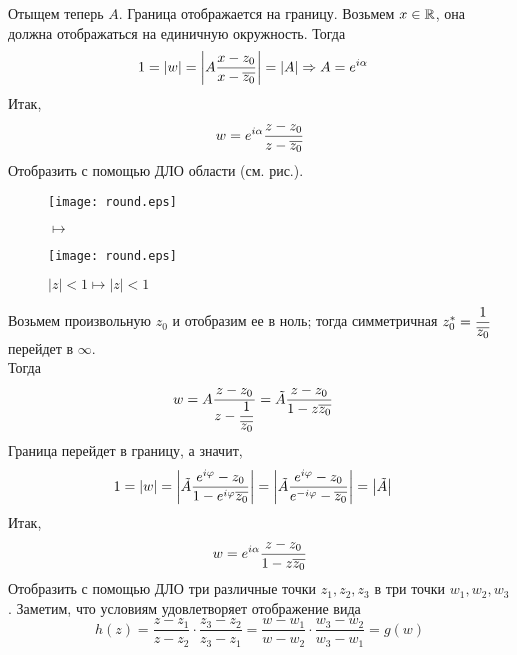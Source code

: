 Отыщем теперь $A$. Граница отображается на границу. Возьмем $x \in \mathbb{R}$, она
должна отображаться на единичную окружность. Тогда
\begin{align*}
    & 1 = \left|{w}\right| = \left|{A\frac{x-z_0}{x-\overline{z_0}}}\right| = \left| A \right| \Rightarrow A = e^{i\alpha}
\end{align*}
Итак,
\begin{equation}\label{(23.6)}
    w = e^{i \alpha}\frac{z-z_0}{z-\overline{z_0}}
\end{equation}
\Example
Отобразить с помощью ДЛО области (см. рис.).
\\
\begin{figure}[h!]
    \begin{minipage}[c]{0.45\textwidth}
        \centering
        \texttt{[image: round.eps]}
    \end{minipage}
    \begin{minipage}[c]{0.1\textwidth}
        \centering
        \LARGE{$\mapsto$}
    \end{minipage}
    \begin{minipage}[c]{0.45\textwidth}
        \centering
        \texttt{[image: round.eps]}
    \end{minipage}
    \label{fig:23.3}
    \caption{$\left| z \right| < 1 \mapsto \left| z \right| < 1$}
\end{figure}
\nonum
Возьмем произвольную $z_0$ и отобразим ее в ноль; тогда симметричная $z_0^* =
\displaystyle \frac{1}{\overline{z_0}}$ перейдет в $\infty$.
\\
Тогда
\begin{align*}
    & w = A\frac{z-z_0}{z-\displaystyle \frac{1}{\overline{z_0}}} = \tilde{A}\frac{z-z_0}{1 - z\overline{z_0}}
\end{align*}
Граница перейдет в границу, а значит,
\begin{align*}
    & 1 = \left|{w}\right| = \left|{\tilde{A}\frac{e^{i \varphi}-z_0}{1 - e^{i \varphi}\overline{z_0}}}\right| = \left|{\tilde{A}\frac{e^{i \varphi}-z_0}{e^{-i \varphi}-\overline{z_0}}}\right| = \left|{\tilde{A}}\right|
\end{align*}
Итак,
\begin{equation}\label{(23.7)}
    w = e^{i \alpha}\frac{z-z_0}{1 - z\overline{z_0}}
\end{equation}
\Example
Отобразить с помощью ДЛО три различные точки $z_1, z_2, z_3$ в три точки $w_1,
w_2,w_3$.
\nonum
Заметим, что условиям удовлетворяет отображение вида
\begin{equation}\label{(23.8)}
    h(z) = \frac{z-z_1}{z-z_2} \cdot \frac{z_3-z_2}{z_3-z_1} = \frac{w-w_1}{w-w_2} \cdot \frac{w_3-w_2}{w_3-w_1} = g(w)
\end{equation}
